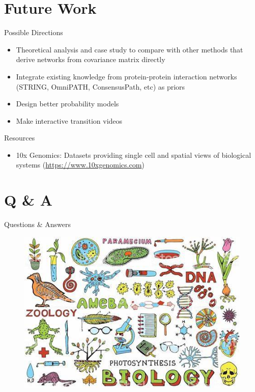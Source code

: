\documentclass[handout,t]{beamer}
\begin{document}

\section{Future Work}

\begin{frame}{Possible Directions}
\begin{itemize}
\item Theoretical analysis and case study to compare with other methods that derive networks from covariance matrix directly
\item Integrate existing knowledge from protein-protein interaction networks (STRING, OmniPATH, ConsensusPath, etc) as priors
\item Design better probability models
\item Make interactive transition videos
\end{itemize}
\end{frame}


\begin{frame}{Resources}
\begin{itemize}
\item 10x Genomics: Datasets providing single cell and spatial views of biological systems (\url{https://www.10xgenomics.com})
\end{itemize}
\end{frame}



\section{Q \& A}
\begin{frame}{Questions \& Answers}
\vspace{-0.3cm}
\begin{figure}
\includegraphics[width=0.85\columnwidth]{th.jpeg}
\end{figure}
\end{frame}
\end{document}
